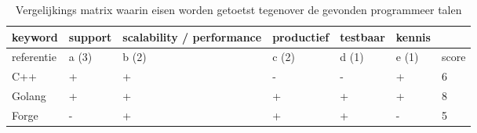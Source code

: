 \begin{table}[bh]
\caption{Vergelijkings matrix waarin eisen worden getoetst tegenover de gevonden programmeer talen}
\label{tab:matrix_hardware}
\begin{tabular}{|l|l|l|l|l|l|l|}
\hline
keyword    & support & scalability / performance & productief & testbaar & kennis &       \\ \hline
referentie & a (3)   & b (2)                     & c (2)      & d (1)    & e (1)  & score \\ \hline
C++        & +       & +                         & -          & -        & +      & 6     \\ \hline
Golang     & +       & +                         & +          & +        & +      & 8     \\ \hline
Forge      & -       & +                         & +          & +        & -      & 5     \\ \hline
\end{tabular}
\end{table}
